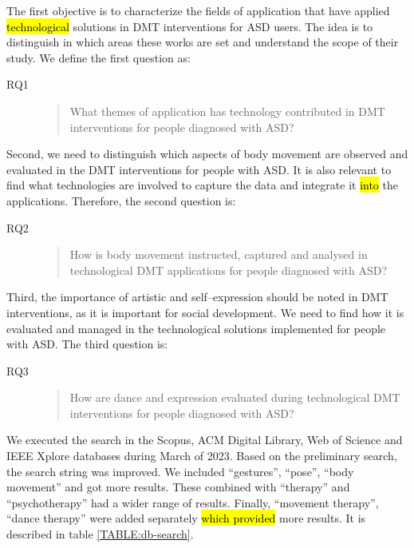 \documentclass[a4paper,fleqn]{cas-sc}
\begin{document}
The first objective is to characterize the fields of application that have applied \hl{technological} solutions in DMT interventions for ASD users.  The idea is to distinguish in which areas these works are set and understand the scope of their study. We define the first question as:

\begin{description}
  \item[RQ1] \begin{quote}What themes of application has technology contributed in DMT interventions for people diagnosed with ASD?\end{quote}
\end{description}


Second, we need to distinguish which aspects of body movement are observed and evaluated in the DMT interventions for people with ASD. It is also relevant to find what technologies are involved to capture the data and integrate it \hl{into} the applications. Therefore, the second question is:

\begin{description}
  \item[RQ2] \begin{quote} How is body movement instructed, captured and analysed in technological DMT applications for people diagnosed with ASD? \end{quote}
\end{description}


Third, the importance of artistic and self--expression should be noted in DMT interventions, as it is important for social development. We need to find how it is evaluated and managed in the technological solutions implemented for people with ASD. The third question is:

\begin{description}
  \item[RQ3] \begin{quote} How are dance and expression evaluated during technological DMT interventions for people diagnosed with ASD? \end{quote}
\end{description}

We executed the search in the Scopus, ACM Digital Library, Web of Science and IEEE Xplore databases during March of 2023. Based on the preliminary search, the search string was improved. We included ``gestures'', ``pose'', ``body movement'' and got more results. These combined with ``therapy'' and ``psychotherapy'' had a wider range of results. Finally, ``movement therapy'', ``dance therapy'' were added separately \hl{which provided} more results. It is described in table \ref{TABLE:db-search}.
\end{document}
